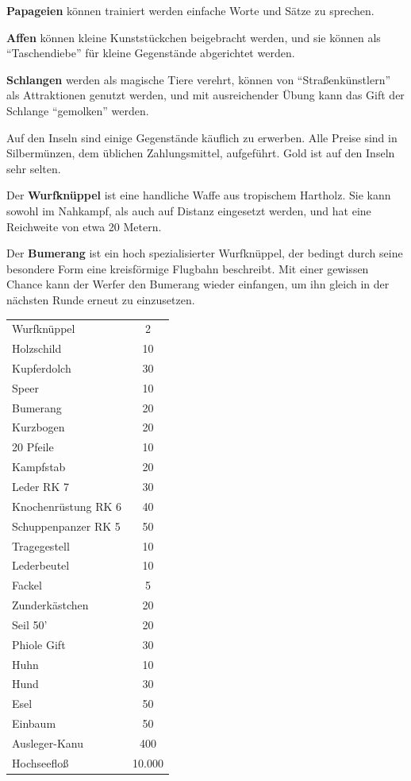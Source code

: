 \documentclass[11pt]{wbzine}
\begin{document}
\begin{multicols}{2}

\textbf{Papageien} können trainiert werden einfache Worte und Sätze
zu sprechen. 

\textbf{Affen} können kleine Kunststückchen beigebracht
werden, und sie können als ``Taschendiebe'' für kleine Gegenstände
abgerichtet werden.

\textbf{Schlangen} werden als magische Tiere verehrt, können von
``Straßenkünstlern'' als Attraktionen genutzt werden, und mit
ausreichender Übung kann das Gift der Schlange ``gemolken'' werden.

Auf den Inseln sind einige Gegenstände käuflich zu erwerben. 
Alle Preise sind in Silbermünzen, dem üblichen Zahlungsmittel,
aufgeführt. Gold ist auf den Inseln sehr selten.


Der \textbf{Wurfknüppel} ist eine handliche Waffe aus tropischem
Hartholz. Sie kann sowohl im Nahkampf, als auch auf Distanz
eingesetzt werden, und hat eine Reichweite von etwa 20 Metern.

Der \textbf{Bumerang} ist ein hoch spezialisierter Wurfknüppel, der
bedingt durch seine besondere Form eine kreisförmige Flugbahn
beschreibt. Mit einer gewissen Chance kann der Werfer den Bumerang
wieder einfangen, um ihn gleich in der nächsten Runde erneut zu
einzusetzen.


\begin{tabularx}{\columnwidth}{Zc}
    Wurfknüppel & 2\\
    Holzschild     & 10\\
    Kupferdolch     &30\\
    Speer           &10\\
    Bumerang        &20\\
    Kurzbogen       &20\\
    20 Pfeile       &10\\
    Kampfstab       &20\\
    Leder RK 7           &   30\\
    Knochenrüstung RK 6            &40\\
    Schuppenpanzer RK 5     &50\\
    Tragegestell    &10\\
    Lederbeutel     &10\\
    Fackel         & 5\\
    Zunderkästchen  &20\\
    Seil 50'        &20\\
    Phiole Gift     &30\\
    Huhn         &10\\
    Hund            & 30\\
    Esel          &50\\
    Einbaum         &50\\
    Ausleger-Kanu   &400\\
    Hochseefloß      &10.000\\
\end{tabularx}


\end{multicols}
\end{document}
